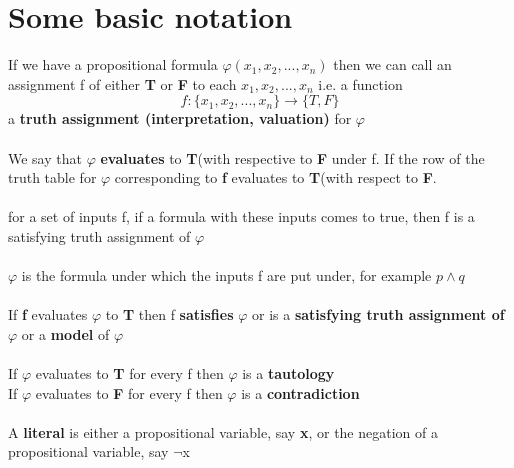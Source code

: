 \documentclass{article}[18pt]
\begin{document}
\section{Some basic notation}
If we have a propositional formula $\varphi(x_1,x_2,...,x_n)$ then we can call an assignment f of either \textbf{T} or \textbf{F} to each $x_1,x_2,...,x_n$ i.e. a function
$$f:\{x_1,x_2,...,x_n\}\rightarrow \{T,F\}$$
a \textbf{truth assignment (interpretation, valuation)} for $\varphi$\\
\\
We say that $\varphi$ \textbf{evaluates} to \textbf{T}(with respective to \textbf{F} under f. If the row of the truth table for $\varphi$ corresponding to \textbf{f} evaluates to \textbf{T}(with respect to \textbf{F}.\\
\\
for a set of inputs f, if a formula with these inputs comes to true, then f is a satisfying truth assignment of $\varphi$\\
\\
$\varphi$ is the formula under which the inputs f are put under, for example $p\land q$\\
\\
If \textbf{f} evaluates $\varphi$ to \textbf{T} then f \textbf{satisfies} $\varphi$ or is a \textbf{satisfying truth assignment of} $\varphi$ or a \textbf{model} of $\varphi$\\
\\
If $\varphi$ evaluates to \textbf{T} for every f then $\varphi$ is a \textbf{tautology}\\
If $\varphi$ evaluates to \textbf{F} for every f then $\varphi$ is a \textbf{contradiction}\\
\\
A \textbf{literal} is either a propositional variable, say \textbf{x}, or the negation of a propositional variable, say $\lnot$x
\end{document}
